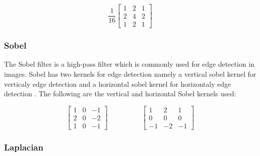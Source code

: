 \begin{equation}
    \label{kernel:gaussianblur}
    \frac{1}{16}
    \left[
    \begin{matrix}
 1 & 2 & 1 \\
 2 & 4 & 2 \\
 1 & 2 & 1
    \end{matrix}
    \right]
\end{equation}

\subsubsection{Sobel}

The Sobel filter is a high-pass filter which is commonly used for edge detection in images. Sobel has two kernels for edge detection namely a vertical sobel kernel for verticaly edge detection and a horizontal sobel kernel for horizontaly edge detection \cite{pdf:marcin}. The following are the vertical and horizontal Sobel kernels used:

\begin{equation}
    \label{kernel:sobel}
    \left[
    \begin{matrix}
 1 & 0 & -1 \\
 2 & 0 & -2 \\
 1 & 0 & -1
    \end{matrix}
    \right]
    \hspace{2cm}
    \left[
 \begin{matrix}
 1 & 2 & 1 \\
 0 & 0 & 0 \\
 -1 & -2 & -1
    \end{matrix}
    \right]
\end{equation}

\subsubsection{Laplacian}

